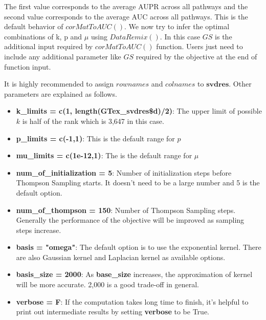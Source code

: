 \documentclass{article}
\begin{document}
The first value corresponds to the average AUPR across all pathways and the second value corresponds to the average AUC across all pathways. This is the default behavior of $corMatToAUC()$. We now try to infer the optimal combinations of k, p and $\mu$ using $DataRemix()$. In this case $GS$ is the additional input required by $corMatToAUC()$ function. Users just need to include any additional parameter like $GS$ required by the objective at the end of function input.
\begin{Schunk}
\end{Schunk}
It is highly recommended to assign $rownames$ and $colnames$ to $\textbf{svdres}$. Other parameters are explained as follows.
\begin{itemize}
\item \textbf{k\_limits = c(1, length(GTex\_svdres\$d)/2)}: The upper limit of possible $k$ is half of the rank which is 3,647 in this case.
\item \textbf{p\_limits = c(-1,1)}: This is the default range for $p$
\item \textbf{mu\_limits = c(1e-12,1)}: The is the default range for $\mu$
\item \textbf{num\_of\_initialization = 5}: Number of initialization steps before Thompson Sampling starts. It doesn't need to be a large number and 5 is the default option.
\item \textbf{num\_of\_thompson = 150}: Number of Thompson Sampling steps. Generally the performance of the objective will be improved as sampling steps increase.
\item \textbf{basis = "omega"}: The default option is to use the exponential kernel. There are also Gaussian kernel and Laplacian kernel as available options.
\item \textbf{basis\_size = 2000}: As \textbf{base\_size} increases, the approximation of kernel will be more accurate. 2,000 is a good trade-off in general.
\item \textbf{verbose = F}: If the computation takes long time to finish, it's helpful to print out intermediate results by setting \textbf{verbose} to be True.
\end{itemize}
\end{document}

